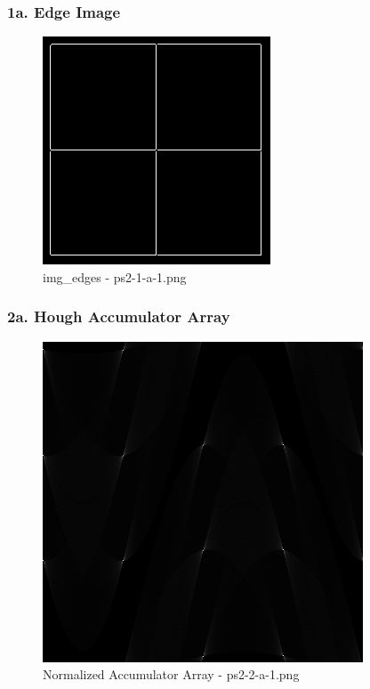 	\begin{frame}
		\frametitle{1a. Edge Image}
		
		\begin{figure}[!htb]
			\centering
			\includegraphics[height=0.65\textheight]{./output/ps2-1-a-1.png}
			\caption{img\_edges - ps2-1-a-1.png} 
		\end{figure}	
		
	\end{frame}
	
	\begin{frame}
		\frametitle{2a. Hough Accumulator Array}
		
		\begin{figure}[!htb]
			\centering
			\includegraphics[height=0.65\textheight]{./output/ps2-2-a-1.png}
			\caption{Normalized Accumulator Array - ps2-2-a-1.png} 
		\end{figure}	
		
	\end{frame}

